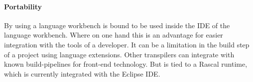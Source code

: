 \paragraph{Portability}
By using a language workbench \projectname is bound to be used inside the IDE of the language workbench. Where on one hand this is an advantage for easier integration with the tools of a developer. It can be a limitation in the build step of a project using language extensions. Other transpilers can integrate with known build-pipelines for front-end technology. But \projectname is tied to a Rascal runtime, which is currently integrated with the Eclipse IDE.